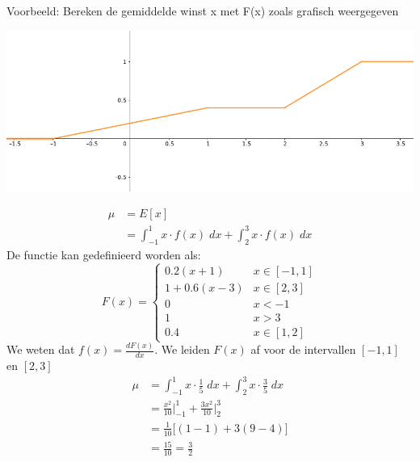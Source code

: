 \documentclass[12pt]{report}
\newcommand{\example}[2]{
      \hrulefill
      
      Voorbeeld: #1
      
      #2
      
      \hrulefill
  }
\begin{document}
\example{Bereken de gemiddelde winst x met F(x) zoals grafisch weergegeven 
\begin{center}
 \includegraphics[width=0.5\linewidth]{slide_7}
\end{center}

}{
\begin{equation*}
 \begin{split}
  \mu & = E[x] \\
      & = \int_{-1}^{1} x\cdot f(x)\; dx + \int_{2}^{3} x\cdot f(x)\; dx
 \end{split}
\end{equation*}
De functie kan gedefinieerd worden als:
$$F(x) = \begin{cases}
   0.2(x + 1) & x \in [-1,1] \\
   1 + 0.6(x-3) & x \in [2,3] \\
   0 & x < -1 \\
   1 & x > 3 \\
   0.4 & x \in [1, 2]
\end{cases}$$
We weten dat $f(x) = \frac{dF(x)}{dx}$. We leiden $F(x)$ af voor de intervallen $[-1, 1]$ en $[2, 3]$ 
\begin{equation*}
      \begin{split}
       \mu & = \int_{-1}^{1} x\cdot \frac{1}{5}\; dx + \int_{2}^{3} x\cdot \frac{3}{5}\; dx \\
           & = \frac{x^2}{10}\bigg|_{-1}^{1} + \frac{3x^2}{10}\bigg|_{2}^{3} \\
           & = \frac{1}{10}\bigg[(1 - 1) + 3(9 - 4)      \bigg] \\
           & = \frac{15}{10} = \frac{3}{2}
      \end{split}
\end{equation*}
}
\end{document}

